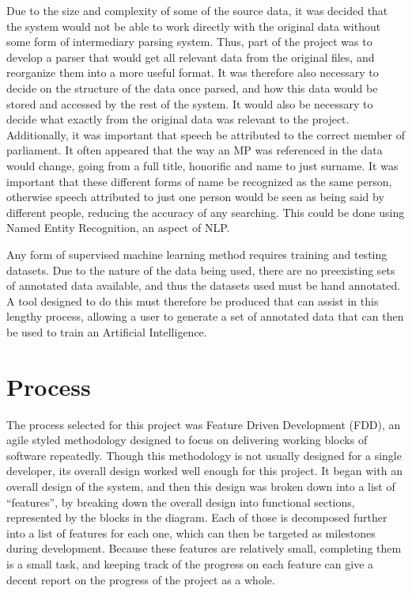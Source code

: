 Due to the size and complexity of some of the source data, it was decided that the system would not be able to work directly with the original data without some form of intermediary parsing system. Thus, part of the project was to develop a parser that would get all relevant data from the original files, and reorganize them into a more useful format. It was therefore also necessary to decide on the structure of the data once parsed, and how this data would be stored and accessed by the rest of the system. It would also be necessary to decide what exactly from the original data was relevant to the project.
Additionally, it was important that speech be attributed to the correct member of parliament. It often appeared that the way an MP was referenced in the data would change, going from a full title, honorific and name to just surname. It was important that these different forms of name be recognized as the same person, otherwise speech attributed to just one person would be seen as being said by different people, reducing the accuracy of any searching. This could be done using Named Entity Recognition, an aspect of NLP.

Any form of supervised machine learning method requires training and testing datasets. Due to the nature of the data being used, there are no preexisting sets of annotated data available, and thus the datasets used must be hand annotated. A tool designed to do this must therefore be produced that can assist in this lengthy process, allowing a user to generate a set of annotated data that can then be used to train an Artificial Intelligence.

\section{Process}
\label{sec:bck_process}
The process selected for this project was Feature Driven Development (FDD), an agile styled methodology designed to focus on delivering working blocks of software repeatedly. Though this methodology is not usually designed for a single developer, its overall design worked well enough for this project. It began with an overall design of the system, and then this design was broken down into a list of “features”, by breaking down the overall design into functional sections, represented by the blocks in the diagram. Each of those is decomposed further into a list of features for each one, which can then be targeted as milestones during development. Because these features are relatively  small, completing them is a small task, and keeping track of the progress on each feature can give a decent report on the progress of the project as a whole.

